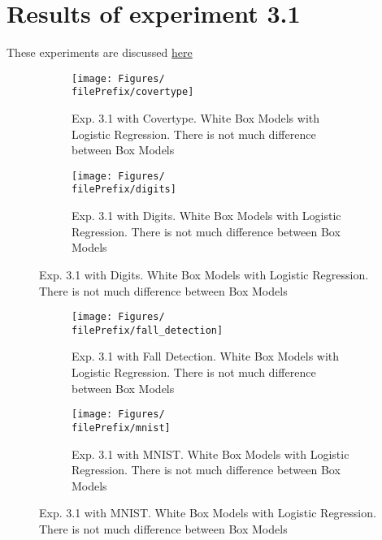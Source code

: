 
\newcommand{\major}{3}
\newcommand{\minor}{1}

\newcommand{\undPrefix}{\major_\minor}
\newcommand{\dotPrefix}{\major.\minor}
\newcommand{\scoPrefix}{\major-\minor}
\newcommand{\filePrefix}{\undPrefix}

\chapter{Results of experiment \dotPrefix} %


\label{Appendix\scoPrefix} %

These experiments are discussed \hyperref[disc:h3]{here}
\begin{figure}[ht]
  \centering
  \begin{subfigure}[t]{0.5\linewidth}
    \centering\captionsetup{width=.8\linewidth}\texttt{[image: Figures/\\filePrefix/covertype]}
    \caption{Exp. 3.1 with Covertype. White Box Models with Logistic Regression. There is not much difference between Box Models}
    \label{fig:\undPrefix_covertype}
  \end{subfigure}%
  \begin{subfigure}[t]{0.5\linewidth}
    \centering\captionsetup{width=.8\linewidth}\texttt{[image: Figures/\\filePrefix/digits]}
    \caption{Exp. 3.1 with Digits. White Box Models with Logistic Regression. There is not much difference between Box Models}
    \label{fig:\undPrefix_digits}
  \end{subfigure}
\end{figure}


\begin{figure}[ht]
  \centering
  \begin{subfigure}[t]{0.5\linewidth}
    \centering\captionsetup{width=.8\linewidth}\texttt{[image: Figures/\\filePrefix/fall\_detection]}
    \caption{Exp. 3.1 with Fall Detection. White Box Models with Logistic Regression. There is not much difference between Box Models}
    \label{fig:\undPrefix_fall_detection}
  \end{subfigure}%
  \begin{subfigure}[t]{0.5\linewidth}
    \centering\captionsetup{width=.8\linewidth}\texttt{[image: Figures/\\filePrefix/mnist]}
    \caption{Exp. 3.1 with MNIST. White Box Models with Logistic Regression. There is not much difference between Box Models}
    \label{fig:\undPrefix_mnist}
  \end{subfigure}
\end{figure}


